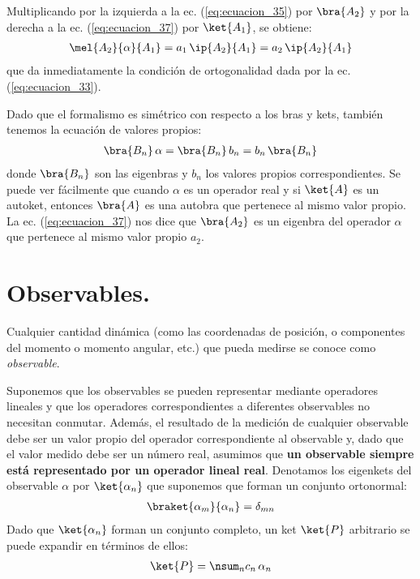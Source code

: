 Multiplicando por la izquierda a la ec. (\ref{eq:ecuacion_35}) por $\bra{A_{2}}$ y por la derecha a la ec. (\ref{eq:ecuacion_37}) por $\ket{A_{1}}$, se obtiene:
\begin{align*}
\mel{A_{2}}{\alpha}{A_{1}} = a_{1} \, \ip{A_{2}}{A_{1}} = a_{2} \, \ip{A_{2}}{A_{1}}
\end{align*}
que da inmediatamente la condición de ortogonalidad dada por la ec. (\ref{eq:ecuacion_33}).
\par
Dado que el formalismo es simétrico con respecto a los bras y kets, también tenemos la ecuación de valores propios:
\begin{align}
\bra{B_{n}} \, \alpha = \bra{B_{n}} \, b_{n} = b_{n} \, \bra{B_{n}}
\end{align}
donde $\bra{B_{n}}$ son las eigenbras y $b_{n}$ los valores propios correspondientes. Se puede ver fácilmente que cuando $\alpha$ es un operador real y si $\ket{A}$ es un autoket, entonces $\bra{A}$ es una autobra que pertenece al mismo valor propio. La ec. (\ref{eq:ecuacion_37}) nos dice que $\bra{A_{2}}$ es un eigenbra del operador $\alpha$ que pertenece al mismo valor propio $a_{2}$.

\section{Observables.}

Cualquier cantidad dinámica (como las coordenadas de posición, o componentes del momento o momento angular, etc.) que pueda medirse se conoce como \emph{observable}.
\par
Suponemos que los observables se pueden representar mediante operadores lineales y que los operadores correspondientes a diferentes observables no necesitan conmutar. Además, el resultado de la medición de cualquier observable debe ser un valor propio del operador correspondiente al observable y, dado que el valor medido debe ser un número real, asumimos que \textbf{un observable siempre está representado por un operador lineal real}. Denotamos los eigenkets del observable $\alpha$ por $\ket{\alpha_{n}}$ que suponemos que forman un conjunto ortonormal:
\begin{align*}
\braket{\alpha_{m}}{\alpha_{n}} = \delta_{mn}
\end{align*}
Dado que $\ket{\alpha_{n}}$ forman un conjunto completo, un ket $\ket{P}$ arbitrario se puede expandir en términos de ellos:
\begin{align*}
\ket{P} = \nsum_{n} c_{n} \, \alpha_{n}
\end{align*}

